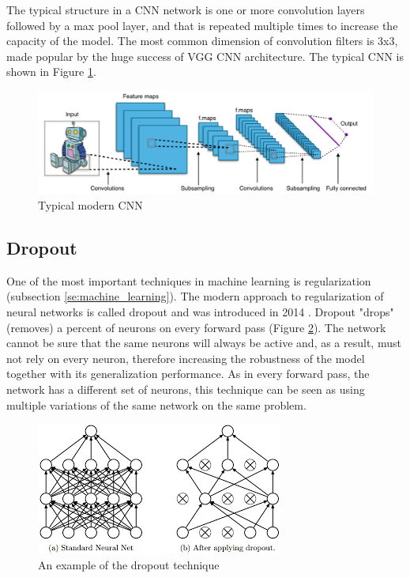 \documentclass[times, utf8, diplomski]{fer}
\begin{document}
The typical structure in a CNN network is one or more convolution layers followed by a max pool layer, and that is repeated multiple times to increase the capacity of the model. The most common dimension of convolution filters is 3x3, made popular by the huge success of VGG \citep{simonyan_very_2014} CNN architecture. The typical CNN is shown in Figure \ref{fig:cnn}.

\begin{figure}
  \includegraphics[scale=0.43]{figures/cnn.png}
  \centering
  \caption{Typical modern CNN}
  \label{fig:cnn}
\end{figure}

\subsection{Dropout} \label{se:dropout}

One of the most important techniques in machine learning is regularization (subsection \ref{se:machine_learning}). The modern approach to regularization of neural networks is called dropout and was introduced in 2014 \citep{srivastava_dropout:_2014}. Dropout "drops" (removes) a percent of neurons on every forward pass (Figure \ref{fig:dropout}). The network cannot be sure that the same neurons will always be active and, as a result, must not rely on every neuron, therefore increasing the robustness of the model together with its generalization performance. As in every forward pass, the network has a different set of neurons, this technique can be seen as using multiple variations of the same network on the same problem.

\begin{figure}
  \includegraphics[scale=0.91]{figures/dropout.png}
  \centering
  \caption{An example of the dropout technique}
  \label{fig:dropout}
\end{figure}
\end{document}
